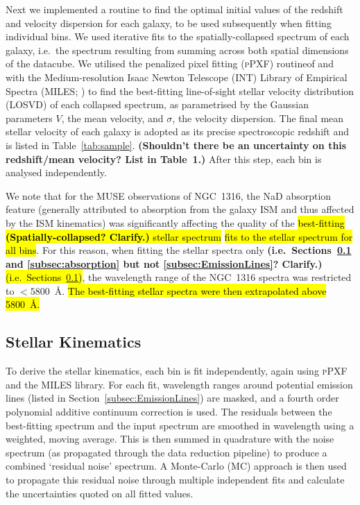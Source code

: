 \documentclass[a4paper,fleqn,usenatbib]{mnras}
\DeclareRobustCommand{\removed}[1]{{\sethlcolor{red}\hl{#1}}}
\DeclareRobustCommand{\added}[1]{{\sethlcolor{green}\hl{#1}}}
\begin{document}
Next we implemented a routine to find the optimal initial values of
the redshift and velocity dispersion for each galaxy, to be used
subsequently when fitting individual bins. We used iterative fits to
the spatially-collapsed spectrum of each galaxy, i.e.\ the spectrum
resulting from summing across both spatial dimensions of the
datacube. We utilised the penalized pixel fitting (\textsc{pPXF})
routine\footnotemark[1] of \citet{Cappellari2004} and
\citet{Cappellari2016a} with the Medium-resolution Isaac Newton
Telescope (INT) Library of Empirical Spectra (MILES;
\citealt{Sanchez-Blazquez2006, Falcon-Barroso2011a}) to find the
best-fitting line-of-sight stellar velocity distribution (LOSVD) of
each collapsed spectrum, as parametrised by the Gaussian parameters
$V$, the mean velocity, and $\sigma$, the velocity dispersion. The
final mean stellar velocity of each galaxy is adopted as its precise
spectroscopic redshift and is listed in Table~\ref{tab:sample}. {\bf
  (Shouldn't there be an uncertainty on this redshift/mean velocity?
  List in Table~1.)} After this step, each bin is analysed
independently.

We note that for the MUSE observations of NGC~1316, the NaD absorption
feature (generally attributed to absorption from the galaxy ISM and
thus affected by the ISM kinematics) was significantly affecting the
quality of the \removed{best-fitting \textbf{(Spatially-collapsed? 
Clarify.)} stellar spectrum} \added{fits to the stellar 
spectrum for all bins}. For this reason, when fitting the stellar spectra
only {\bf (i.e.\ Sections~\ref{subsec:starKin} and
  \ref{subsec:absorption} but not \ref{subsec:EmissionLines}?
  Clarify.)} \added{(i.e.\ Sections~\ref{subsec:starKin})}, the wavelength range 
of the NGC~1316 spectra was restricted to $<5800$~\AA. \added{The best-fitting 
stellar spectra were then extrapolated above 5800~\AA.}


\subsection{Stellar Kinematics}
\label{subsec:starKin}

To derive the stellar kinematics, each bin is fit independently, again
using \textsc{pPXF} and the MILES library. For each fit, wavelength
ranges around potential emission lines (listed in
Section~\ref{subsec:EmissionLines}) are masked, and a fourth order
polynomial additive continuum correction is used. The residuals
between the best-fitting spectrum and the input spectrum are smoothed
in wavelength using a weighted, moving average. This is then summed in
quadrature with the noise spectrum (as propagated through the data
reduction pipeline) to produce a combined `residual noise' spectrum. A
Monte-Carlo (MC) approach is then used to propagate this residual
noise through multiple independent fits and calculate the
uncertainties quoted on all fitted values.
\end{document}
